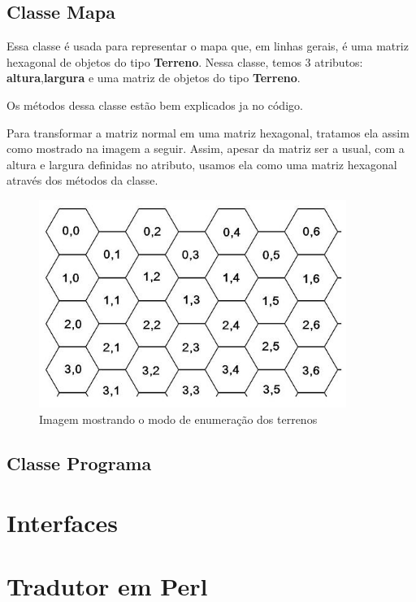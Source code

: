 \documentclass[11pt]{article}
\begin{document}
\subsection{Classe Mapa}

Essa classe é usada para representar o mapa que, em linhas gerais, é uma matriz hexagonal de objetos do tipo \textbf{\color{red}Terreno}. Nessa classe, temos 3 atributos: \textbf{\color{red}altura},\textbf{\color{red}largura} e uma matriz de objetos do tipo \textbf{\color{red}Terreno}.

Os métodos dessa classe estão bem explicados ja no código.

Para transformar a matriz normal em uma matriz hexagonal, tratamos ela assim como mostrado na imagem a seguir. Assim, apesar da matriz ser a usual, com a altura e largura definidas no atributo, usamos ela como uma matriz hexagonal através dos métodos da classe.

\begin{figure}[h]

    \center

    \includegraphics[width=10cm]{hex_array.jpg}

    \label{hexmatrix}

    \caption{Imagem mostrando o modo de enumeração dos terrenos}

\end{figure}

\subsection{Classe Programa}

\section{Interfaces}

\section{Tradutor em Perl}
\end{document}
